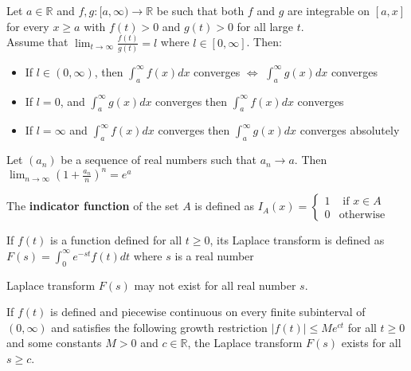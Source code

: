 \begin{prop}
    Let $a \in \mathbb{R}$ and $f,g: [a, \infty) \to \mathbb{R}$ be such that both $f$ and $g$ are integrable on $[a,x]$ for every $x \geq a$ with $f(t) > 0$ and $g(t) > 0$ for all large $t$. \\ Assume that
    $\displaystyle \lim_{t \to \infty} \frac{f(t)}{g(t)} = l$ where $l \in [0, \infty]$. Then:
    \begin{itemize}
        \item If $l \in (0, \infty)$, then $\int_a^\infty f(x)dx$ converges $\iff$ $\int_a^\infty g(x)dx$ converges
        \item If $l = 0$, and $\int_a^\infty g(x)dx$ converges then $\int_a^\infty f(x)dx$ converges
        \item If $l = \infty$ and $\int_a^\infty f(x)dx$ converges then $\int_a^\infty g(x)dx$ converges absolutely
    \end{itemize}
\end{prop}

\begin{prop}
    Let $(a_n)$ be a sequence of real numbers such that $a_n \to a$. Then $\lim_{n \to \infty} \left( 1 + \frac{a_n}{n} \right)^n = e^a$ 
\end{prop}

\begin{defn}
    The \textbf{indicator function} of the set $A$ is defined as $I_A (x) = \begin{cases} 1 & \text{ if } x \in A \\ 0 & \text{otherwise} \end{cases}$
\end{defn}

\begin{defn}
    If $f(t)$ is a function defined for all $t \geq 0$, its Laplace transform is defined as $F(s) = \int_0^\infty e^{-st} f(t) dt$ where $s$ is a real number
\end{defn}

\begin{note}
    Laplace transform $F(s)$ may not exist for all real number $s$.
\end{note}

\begin{prop}
    If $f(t)$ is defined and piecewise continuous on every finite subinterval of $(0, \infty)$ and satisfies the following growth restriction $|f(t)| \leq M e^{ct}$ for all $t \geq 0$ and some constants $M > 0$ and $c \in \mathbb{R}$, the Laplace transform $F(s)$ exists for all $s \geq c$.
\end{prop}


